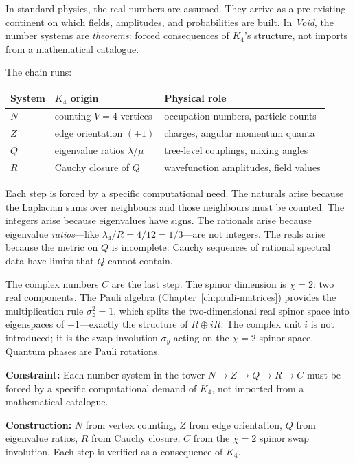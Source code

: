 \documentclass[11pt,a4paper]{book}
\def\mathbb#1{#1}%
\begin{document}
In standard physics, the real numbers are assumed. They arrive as a pre-existing continent on which fields, amplitudes, and probabilities are built. In \textit{Void}, the number systems are \emph{theorems}: forced consequences of $K_4$'s structure, not imports from a mathematical catalogue.

The chain runs:

\begin{center}
\begin{tabular}{lll}
\toprule
System & $K_4$ origin & Physical role \\
\midrule
$\mathbb{N}$ & counting $V = 4$ vertices & occupation numbers, particle counts \\
$\mathbb{Z}$ & edge orientation $(\pm 1)$ & charges, angular momentum quanta \\
$\mathbb{Q}$ & eigenvalue ratios $\lambda/\mu$ & tree-level couplings, mixing angles \\
$\mathbb{R}$ & Cauchy closure of $\mathbb{Q}$ & wavefunction amplitudes, field values \\
\bottomrule
\end{tabular}
\end{center}

Each step is forced by a specific computational need. The naturals arise because the Laplacian sums over neighbours and those neighbours must be counted. The integers arise because eigenvalues have signs. The rationals arise because eigenvalue \emph{ratios}---like $\lambda_4/R = 4/12 = 1/3$---are not integers. The reals arise because the metric on $\mathbb{Q}$ is incomplete: Cauchy sequences of rational spectral data have limits that $\mathbb{Q}$ cannot contain.

The complex numbers $\mathbb{C}$ are the last step. The spinor dimension is $\chi = 2$: two real components. The Pauli algebra (Chapter~\ref{ch:pauli-matrices}) provides the multiplication rule $\sigma_z^2 = 1$, which splits the two-dimensional real spinor space into eigenspaces of $\pm 1$---exactly the structure of $\mathbb{R} \oplus i\mathbb{R}$. The complex unit $i$ is not introduced; it is the swap involution $\sigma_y$ acting on the $\chi = 2$ spinor space. Quantum phases are Pauli rotations.

\textbf{Constraint:} Each number system in the tower $\mathbb{N} \to \mathbb{Z} \to \mathbb{Q} \to \mathbb{R} \to \mathbb{C}$ must be forced by a specific computational demand of $K_4$, not imported from a mathematical catalogue.

\textbf{Construction:} $\mathbb{N}$ from vertex counting, $\mathbb{Z}$ from edge orientation, $\mathbb{Q}$ from eigenvalue ratios, $\mathbb{R}$ from Cauchy closure, $\mathbb{C}$ from the $\chi = 2$ spinor swap involution. Each step is verified as a consequence of $K_4$.
\end{document}
